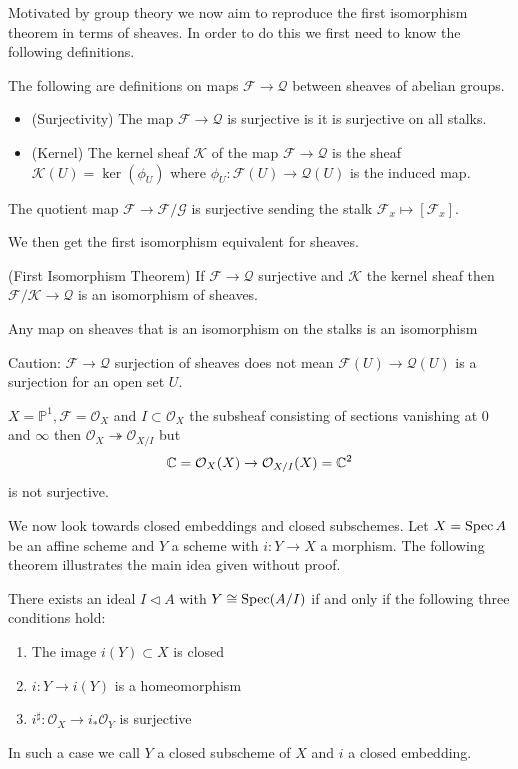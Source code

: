 Motivated by group theory we now aim to reproduce the first isomorphism theorem in terms of sheaves. In order to do this we first need to know the following definitions.
\begin{definition} The following are definitions on maps $\mathcal{F} \to \mathcal{Q}$ between sheaves of abelian groups. 
\begin{itemize}
    \item (Surjectivity) The map $\mathcal{F} \to \mathcal{Q}$ is surjective is it is surjective on all stalks. 
    \item (Kernel) The kernel sheaf $\mathcal{K}$ of the map $\mathcal{F} \to \mathcal{Q}$ is the sheaf $\mathcal{K}(U) = \ker(\phi_U)$ where $\phi_U : \mathcal{F}(U) \to \mathcal{Q}(U)$ is the induced map. 
\end{itemize}
\end{definition}
\begin{example}
    The quotient map $\mathcal{F} \to \mathcal{F}/\mathcal{G}$ is surjective sending the stalk $\mathcal{F}_x \mapsto \left[\mathcal{F}_x\right]$. 
\end{example}
We then get the first isomorphism equivalent for sheaves. 
\begin{corollary} (First Isomorphism Theorem)
    If $\mathcal{F} \to \mathcal{Q}$ surjective and $\mathcal{K}$ the kernel sheaf then $\mathcal{F}/\mathcal{K} \to \mathcal{Q}$ is an isomorphism of sheaves. 
\end{corollary}
\begin{exercise}
    Any map on sheaves that is an isomorphism on the stalks is an isomorphism
\end{exercise}
Caution: $\mathcal{F} \to \mathcal{Q}$ surjection of sheaves does not mean $\mathcal{F}(U) \to \mathcal{Q}(U)$ is a surjection for an open set $U$. 
\begin{nonexample}
    $X = \mathbb{P}^1, \mathcal{F} = \mathcal{O}_X$ and $I \subset \mathcal{O}_X$ the subsheaf consisting of sections vanishing at $0$ and $\infty$ then $\mathcal{O}_X \twoheadrightarrow \mathcal{O}_{X/I}$ but $$\mathbb{C} = \mathcal{O}_X(X) \to \mathcal{O}_{X/I}(X) = \mathbb{C}^2$$ is not surjective. 
\end{nonexample}
We now look towards closed embeddings and closed subschemes. Let $X = \operatorname{Spec} A$ be an affine scheme and $Y$ a scheme with $i : Y \to X$ a morphism. The following theorem illustrates the main idea given without proof. 
\begin{theorem}
    There exists an ideal $I \lhd A$ with $Y \cong \operatorname{Spec}(A/I)$ if and only if the following three conditions hold:
    \begin{enumerate}
        \item The image $i(Y) \subset X$ is closed
        \item $i : Y \to i(Y)$ is a homeomorphism
        \item $i^\sharp : \mathcal{O}_X \to i_*\mathcal{O}_Y$ is surjective
    \end{enumerate}
    In such a case we call $Y$ a closed subscheme of $X$ and $i$ a closed embedding.
\end{theorem}

